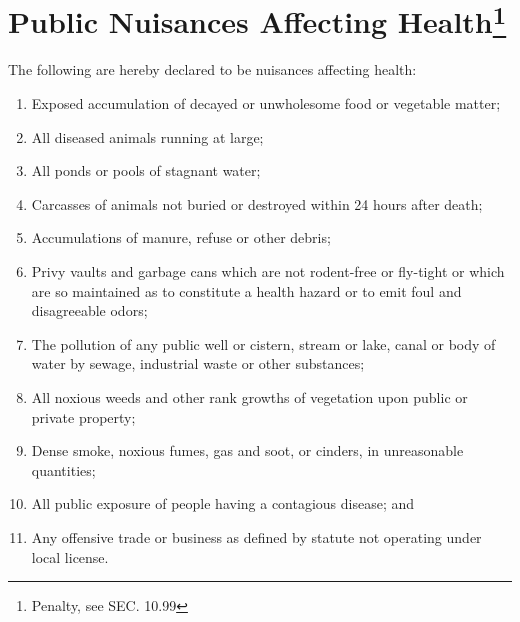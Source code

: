 \section{Public Nuisances Affecting Health\footnote{Penalty, see SEC. 10.99}}
The following are hereby declared to be nuisances affecting health:
\begin{enumerate}[{\indent}A)]
    \item Exposed accumulation of decayed or unwholesome food or vegetable matter;
    \item All diseased animals running at large;
    \item All ponds or pools of stagnant water;
    \item Carcasses of animals not buried or destroyed within 24 hours after death;
    \item Accumulations of manure, refuse or other debris;
    \item Privy vaults and garbage cans which are not rodent-free or fly-tight or which are so maintained as to constitute a health hazard or to emit foul and disagreeable odors;
    \item The pollution of any public well or cistern, stream or lake, canal or body of water by sewage, industrial waste or other substances;
    \item All noxious weeds and other rank growths of vegetation upon public or private property;
    \item Dense smoke, noxious fumes, gas and soot, or cinders, in unreasonable quantities;
    \item All public exposure of people having a contagious disease; and
    \item Any offensive trade or business as defined by statute not operating under local license.
\end{enumerate}

